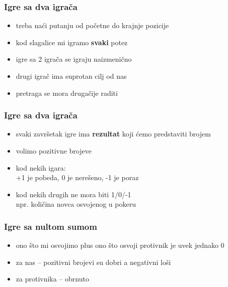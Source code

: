 \documentclass[compress,aspectratio=169]{beamer}
\begin{document}
\begin{frame}[fragile]
  \frametitle{Igre sa dva igrača}
  \begin{itemize}
    \item treba naći putanju od početne do krajnje pozicije
    \item kod slagalice mi igramo \textbf{svaki} potez
    \item igre sa 2 igrača se igraju naizmenično
    \item drugi igrač ima suprotan cilj od nas
    \item pretraga se mora drugačije raditi
  \end{itemize}
\end{frame}

\begin{frame}[fragile]
  \frametitle{Igre sa dva igrača}
  \begin{itemize}
    \item svaki završetak igre ima \textbf{rezultat} koji ćemo predstaviti brojem
    \item volimo pozitivne brojeve
    \item kod nekih igara: \\ +1 je pobeda, 0 je nerešeno, -1 je poraz
    \item kod nekih drugih ne mora biti 1/0/-1 \\ npr. količina novca osvojenog u pokeru
  \end{itemize}
\end{frame}

\begin{frame}[fragile]
  \frametitle{Igre sa nultom sumom}
  \begin{itemize}
    \item ono što mi osvojimo plus ono što osvoji protivnik je uvek jednako 0
    \item za nas -- pozitivni brojevi su dobri a negativni loši
    \item za protivnika -- obrnuto
  \end{itemize}
\end{frame}
\end{document}
